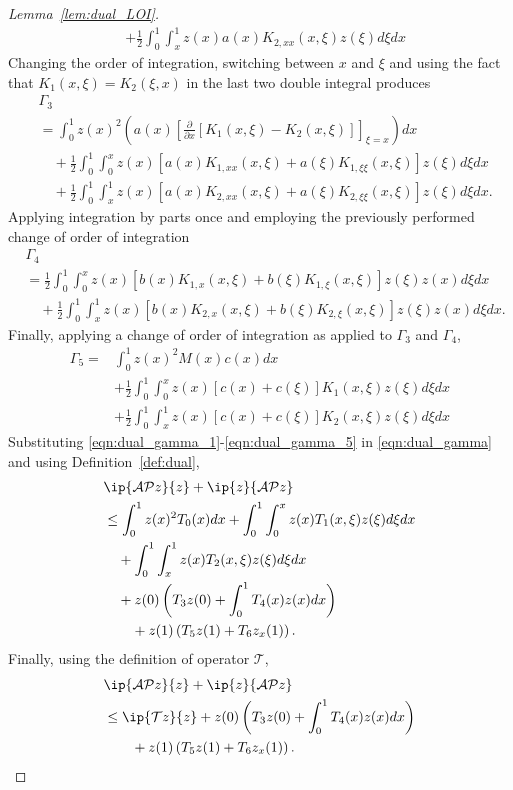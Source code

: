 \documentclass[US letter, 9 pt, conference]{ieeeconf}  \usepackage{setspace}
\newcommand{\pfx}{\frac{\partial}{\partial x}}
\newcommand{\igzo}{\int_0^1}
\newcommand{\igzx}{\int_0^x}
\newcommand{\igxo}{\int_x^1}
\newcommand{\hlf}{\frac{1}{2}}
\newcommand{\mcl}[1]{\mathcal{#1}}
\newcommand{\pop}{\mathcal{P}}
\begin{document}
\begin{proof}[Lemma~\ref{lem:dual_LOI}]
\begin{align}
&+\hlf \igzo \igxo z(x)a(x)K_{2,xx}(x,\xi)z(\xi)d\xi dx \nonumber
\end{align} Changing the order of integration, switching between $x$ and $\xi$ and using the fact that $K_1(x,\xi)=K_2(\xi,x)$ in the last two double integral produces
 \begin{align}
&\Gamma_3 \nonumber \\
&=  \igzo z(x)^2 \left(a(x)\left[\pfx[K_1(x,\xi)-K_2(x,\xi)] \right]_{\xi=x} \right)dx \nonumber \\
& \quad + \hlf \igzo \igzx z(x)\left[a(x)K_{1,xx}(x,\xi)+a(\xi)K_{1,\xi \xi}(x,\xi)\right]z(\xi)d\xi dx \nonumber \\
&\label{eqn:dual_gamma_3} \quad + \hlf \igzo \igxo z(x)\left[a(x)K_{2,xx}(x,\xi)+a(\xi)K_{2,\xi \xi}(x,\xi)\right]z(\xi)d\xi dx.
\end{align} Applying integration by parts once and employing the previously performed change of order of integration
 \begin{align}
 &\Gamma_4 \nonumber \\
 &=\hlf \igzo \igzx z(x) \left[b(x)K_{1,x}(x,\xi)+b(\xi)K_{1,\xi}(x,\xi) \right] z(\xi)z(x)d\xi dx \nonumber \\
 &\label{eqn:dual_gamma_4} \quad +\hlf \igzo \igxo z(x) \left[b(x)K_{2,x}(x,\xi)+b(\xi)K_{2,\xi}(x,\xi) \right] z(\xi)z(x)d\xi dx.
 \end{align} Finally, applying a change of order of integration as applied to $\Gamma_3$ and $\Gamma_4$,
\begin{align}
\Gamma_5=& \igzo z(x)^2 M(x)c(x)dx \nonumber \\
& +\hlf \igzo \igzx z(x) \left[c(x)+c(\xi)\right]K_1(x,\xi)z(\xi)d\xi dx \nonumber \\
&\label{eqn:dual_gamma_5} +\hlf \igzo \igxo z(x) \left[c(x)+c(\xi)\right]K_2(x,\xi)z(\xi)d\xi dx
\end{align} Substituting \eqref{eqn:dual_gamma_1}-\eqref{eqn:dual_gamma_5} in \eqref{eqn:dual_gamma} and using Definition~\ref{def:dual},
\begin{align*}
&\ip{\mcl{A}\pop z}{z}+\ip{z}{\mcl{A}\pop z} \\
&\leq  \igzo z(x)^2 T_0(x)dx + \igzo \igzx z(x)T_1(x,\xi)z(\xi)d\xi dx \\
& \quad  + \igzo \igxo z(x)T_2(x,\xi)z(\xi)d\xi dx \\
&\quad +z(0)\left(T_3z(0)+\igzo T_4(x)z(x)dx \right)\\
& \quad \quad  + z(1) \left(T_5 z(1) +T_6z_x(1) \right).
\end{align*}
Finally, using the definition of operator $\mcl{T}$,
\begin{align*}
&\ip{\mcl{A}\pop z}{z}+\ip{z}{\mcl{A}\pop z} \\
&\leq  \ip{\mcl{T}z}{z}+z(0)\left(T_3z(0)+\igzo T_4(x)z(x)dx \right)\\
& \quad \quad  + z(1) \left(T_5 z(1) +T_6z_x(1) \right).
\end{align*}
\end{proof}
\end{document}
